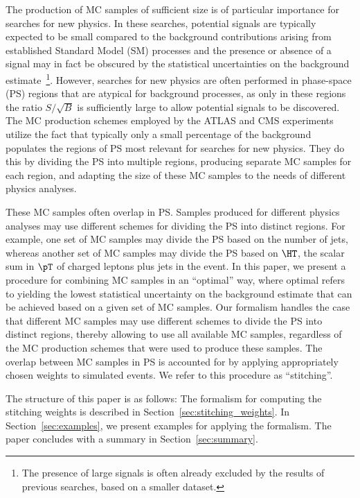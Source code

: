 The production of MC samples of sufficient size is of particular importance for searches for new physics.
In these searches, potential signals are typically expected to be small
compared to the background contributions arising from established Standard Model (SM) processes
and the presence or absence of a signal may in fact be obscured by the statistical uncertainties on the background estimate~\footnote{
The presence of large signals is often already excluded by the results of previous searches, based on a smaller dataset.}.
However, searches for new physics are often performed in phase-space (PS) regions that are atypical for background processes,
as only in these regions the ratio $S/\sqrt{B}$ is sufficiently large to allow potential signals to be discovered.
The MC production schemes employed by the ATLAS and CMS experiments utilize the fact 
that typically only a small percentage of the background populates the regions of PS most relevant for searches for new physics.
They do this by dividing the PS into multiple regions, producing separate MC samples for each region,
and adapting the size of these MC samples to the needs of different physics analyses.

These MC samples often overlap in PS.
Samples produced for different physics analyses may use different schemes for dividing the PS into distinct regions.
For example, one set of MC samples may divide the PS based on the number of jets, 
whereas another set of MC samples may divide the PS based on $\HT$, the scalar sum in $\pT$ of charged leptons plus jets in the event.
In this paper, we present a procedure for combining MC samples in an ``optimal'' way,
where optimal refers to yielding the lowest statistical uncertainty on the background estimate that can be achieved based on a given set of MC samples.
Our formalism handles the case that different MC samples may use different schemes to divide the PS into distinct regions,
thereby allowing to use all available MC samples, regardless of the MC production schemes that were used to produce these samples.
The overlap between MC samples in PS is accounted for by applying appropriately chosen weights to simulated events.
We refer to this procedure as ``stitching''.

The structure of this paper is as follows:
The formalism for computing the stitching weights is described in Section~\ref{sec:stitching_weights}.
In Section~\ref{sec:examples}, we present examples for applying the formalism.
The paper concludes with a summary in Section~\ref{sec:summary}.

